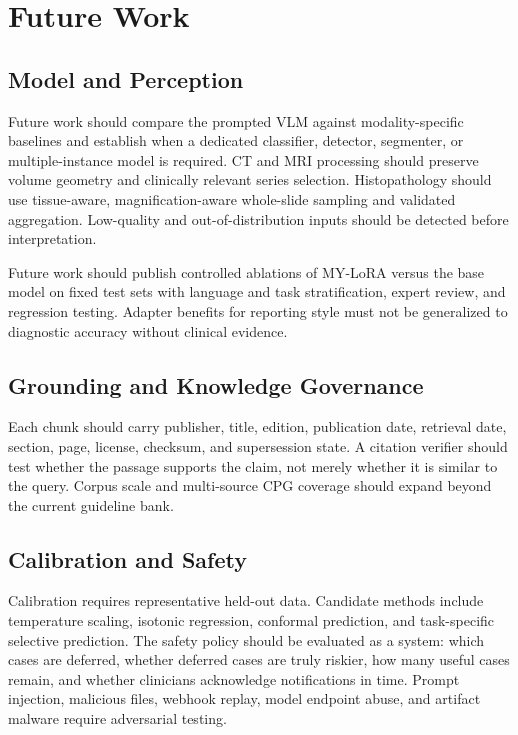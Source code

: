 \documentclass[conference]{IEEEtran}
\begin{document}
\section{Future Work}

\subsection{Model and Perception}

Future work should compare the prompted VLM against modality-specific baselines and establish when a dedicated classifier, detector, segmenter, or multiple-instance model is required. CT and MRI processing should preserve volume geometry and clinically relevant series selection. Histopathology should use tissue-aware, magnification-aware whole-slide sampling and validated aggregation. Low-quality and out-of-distribution inputs should be detected before interpretation.

Future work should publish controlled ablations of MY-LoRA versus the base model on fixed test sets with language and task stratification, expert review, and regression testing. Adapter benefits for reporting style must not be generalized to diagnostic accuracy without clinical evidence.

\subsection{Grounding and Knowledge Governance}

Each chunk should carry publisher, title, edition, publication date, retrieval date, section, page, license, checksum, and supersession state. A citation verifier should test whether the passage supports the claim, not merely whether it is similar to the query. Corpus scale and multi-source CPG coverage should expand beyond the current guideline bank.

\subsection{Calibration and Safety}

Calibration requires representative held-out data. Candidate methods include temperature scaling, isotonic regression, conformal prediction, and task-specific selective prediction. The safety policy should be evaluated as a system: which cases are deferred, whether deferred cases are truly riskier, how many useful cases remain, and whether clinicians acknowledge notifications in time. Prompt injection, malicious files, webhook replay, model endpoint abuse, and artifact malware require adversarial testing.
\end{document}
